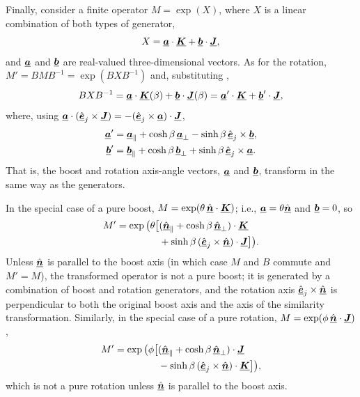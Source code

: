 Finally, consider a finite operator $M = \exp(X)$, where $X$ is a linear combination of both types of generator,
\begin{equation}
X = \Pv{a} \cdot \Pv{K} + \Pv{b} \cdot \Pv{J},
\end{equation}
%
and $\Pv{a}$ and $\Pv{b}$ are real-valued three-dimensional vectors.
%
As for the rotation, $M' = B M B^{-1} = \exp(B X B^{-1})$ and,
substituting ,
\begin{equation}
B X B^{-1} = \Pv{a} \cdot \Pv{K}(\beta) + \Pv{b} \cdot \Pv{J}(\beta) = \Pv{a}' \cdot \Pv{K} + \Pv{b}' \cdot \Pv{J},
\end{equation}
%
where, using $\Pv{a} \cdot (\hat{\Pv{e}}_j \times \Pv{J}) = -(\hat{\Pv{e}}_j \times \Pv{a}) \cdot \Pv{J}$,
\begin{align}
\Pv{a}' &= \Pv{a}_\parallel + \cosh\beta \, \Pv{a}_\perp - \sinh\beta \, \hat{\Pv{e}}_j \times \Pv{b},
\label{eqn:boost_axis_a} \\
\Pv{b}' &= \Pv{b}_\parallel + \cosh\beta \, \Pv{b}_\perp + \sinh\beta \, \hat{\Pv{e}}_j \times \Pv{a}.
\label{eqn:boost_axis_b}
\end{align}
%
That is, the boost and rotation axis-angle vectors, $\Pv{a}$ and $\Pv{b}$, transform in the same way as the generators.

In the special case of a pure boost, $M = \exp(\theta \, \hat{\Pv{n}} \cdot \Pv{K})$; i.e., $\Pv{a}=\theta\hat{\Pv{n}}$ and $\Pv{b}=0$, so
\begin{equation}
\begin{split}
M' = \exp\big( \theta \big[ & (\hat{\Pv{n}}_\parallel + \cosh\beta \, \hat{\Pv{n}}_\perp) \cdot \Pv{K} \\
   & + \sinh\beta \, (\hat{\Pv{e}}_j \times \hat{\Pv{n}}) \cdot \Pv{J} \big] \big).
\end{split}
\end{equation}
%
Unless $\hat{\Pv{n}}$ is parallel to the boost axis (in which case $M$ and $B$ commute and $M'=M$),
the transformed operator is not a pure boost; it is generated by a combination of
boost and rotation generators, and the rotation axis $\hat{\Pv{e}}_j \times \hat{\Pv{n}}$ is
perpendicular to both the original boost axis and the axis of the similarity transformation.
%
Similarly, in the special case of a pure rotation, $M = \exp(\phi \, \hat{\Pv{n}} \cdot \Pv{J})$,
\begin{equation}
\begin{split}
M' = \exp\big( \phi \big[ & (\hat{\Pv{n}}_\parallel + \cosh\beta \, \hat{\Pv{n}}_\perp) \cdot \Pv{J} \\
   & - \sinh\beta \, (\hat{\Pv{e}}_j \times \hat{\Pv{n}}) \cdot \Pv{K} \big] \big),
\end{split}
\end{equation}
%
which is not a pure rotation unless $\hat{\Pv{n}}$ is parallel to the boost axis.

